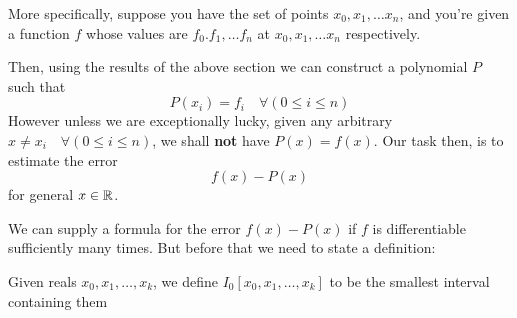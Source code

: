 More specifically, suppose you have the set of points $x_0, x_1, \dots x_n$, and you're given a function $f$ whose values are $f_0. f_1, \dots f_n$ at $x_0, x_1, \dots x_n$ respectively.

Then, using the results of the above section we can construct a polynomial $P$ such that
\[
  P(x_i) = f_i \quad \forall(0 \leq i \leq n)
\]
However unless we are exceptionally lucky, given any arbitrary $x \neq x_i \quad \forall(0 \leq i \leq n)$, we shall \textbf{not} have $P(x) = f(x)$. Our task then, is to estimate the error
\[
  f(x) - P(x)
\]
for general $x \in \mathbb{R}$.

We can supply a formula for the error $f(x) - P(x)$ if $f$ is differentiable sufficiently many times. But before that we need to state a definition:
\begin{defn}
  Given reals $x_0, x_1, \dots ,x_k$, we define $I_0[x_0, x_1, \dots ,x_k]$ to be the smallest interval containing them
\end{defn}

